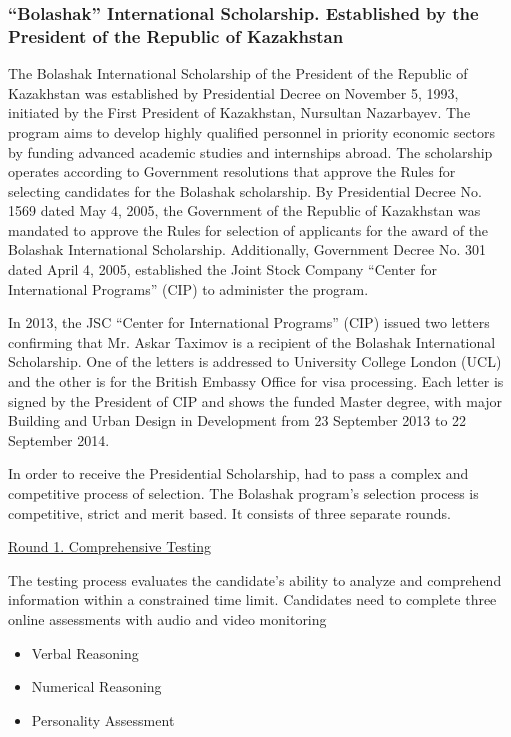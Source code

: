 \subsubsection{``Bolashak'' International Scholarship. Established by the President of the Republic of Kazakhstan}
\label{subsubsec:BolashakStipend}
The Bolashak International Scholarship of the President of the Republic of Kazakhstan was established by Presidential Decree on November 5, 1993, initiated by the First President of Kazakhstan, Nursultan Nazarbayev. The program aims to develop highly qualified personnel in priority economic sectors by funding advanced academic studies and internships abroad. The scholarship operates according to Government resolutions that approve the Rules for selecting candidates for the Bolashak scholarship. By Presidential Decree No. 1569 dated May 4, 2005, the Government of the Republic of Kazakhstan was mandated to approve the Rules for selection of applicants for the award of the Bolashak International Scholarship. Additionally, Government Decree No. 301 dated April 4, 2005, established the Joint Stock Company ``Center for International Programs'' (CIP) to administer the program.

In 2013, the JSC ``Center for International Programs'' (CIP) issued two letters confirming that Mr. Askar Taximov is a recipient of the Bolashak International Scholarship. One of the letters is addressed to University College London (UCL) and the other is for the British Embassy Office for visa processing. Each letter is signed by the President of CIP and shows the funded Master degree, with major Building and Urban Design in Development from 23 September 2013 to 22 September 2014.

In order to receive the Presidential Scholarship, \mrl{} had to pass a complex and competitive process of selection. The Bolashak program's selection process is competitive, strict and merit based. It consists of three separate rounds.

\underline{Round 1. Comprehensive Testing}

The testing process evaluates the candidate's ability to analyze and comprehend information within a constrained time limit. Candidates need to complete three online assessments with audio and video monitoring

\vspace{-0.5\baselineskip}
\begin{itemize}[nosep]
\item Verbal Reasoning
\item Numerical Reasoning
\item Personality Assessment
\end{itemize}

